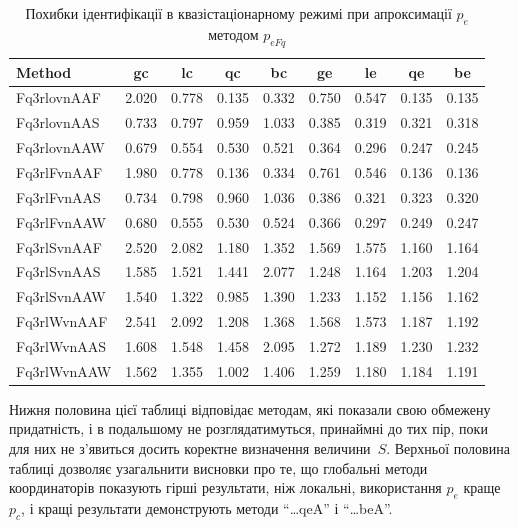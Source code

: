 \begin{table}[htb!]
  \caption{Похибки ідентифікації в квазістаціонарному режимі при апроксимації $p_e$ методом $p_{eFq}$}
  \label{atu:t:err_test_id_Fq}
  \begin{center}
    \begin{tabular}{|l|c|c|c|c|c|c|c|c|}
    \hline
    Method      & gc    & lc    & qc    & bc    & ge     & le    & qe    & be    \\ \hline
    Fq3rlovnAAF & 2.020 & 0.778 & 0.135 & 0.332 & 0.750  & 0.547 & 0.135 & 0.135 \\ \hline
    Fq3rlovnAAS & 0.733 & 0.797 & 0.959 & 1.033 & 0.385  & 0.319 & 0.321 & 0.318 \\ \hline
    Fq3rlovnAAW & 0.679 & 0.554 & 0.530 & 0.521 & 0.364  & 0.296 & 0.247 & 0.245 \\ \hline
    Fq3rlFvnAAF & 1.980 & 0.778 & 0.136 & 0.334 & 0.761  & 0.546 & 0.136 & 0.136 \\ \hline
    Fq3rlFvnAAS & 0.734 & 0.798 & 0.960 & 1.036 & 0.386  & 0.321 & 0.323 & 0.320 \\ \hline
    Fq3rlFvnAAW & 0.680 & 0.555 & 0.530 & 0.524 & 0.366  & 0.297 & 0.249 & 0.247 \\ \hline
    Fq3rlSvnAAF & 2.520 & 2.082 & 1.180 & 1.352 & 1.569  & 1.575 & 1.160 & 1.164 \\ \hline
    Fq3rlSvnAAS & 1.585 & 1.521 & 1.441 & 2.077 & 1.248  & 1.164 & 1.203 & 1.204 \\ \hline
    Fq3rlSvnAAW & 1.540 & 1.322 & 0.985 & 1.390 & 1.233  & 1.152 & 1.156 & 1.162 \\ \hline
    Fq3rlWvnAAF & 2.541 & 2.092 & 1.208 & 1.368 & 1.568  & 1.573 & 1.187 & 1.192 \\ \hline
    Fq3rlWvnAAS & 1.608 & 1.548 & 1.458 & 2.095 & 1.272  & 1.189 & 1.230 & 1.232 \\ \hline
    Fq3rlWvnAAW & 1.562 & 1.355 & 1.002 & 1.406 & 1.259  & 1.180 & 1.184 & 1.191 \\ \hline
    \end{tabular}
  \end{center}
\end{table}

Нижня половина цієї таблиці відповідає методам, які показали
свою обмежену придатність, і в подальшому не розглядатимуться,
принаймні до тих пір, поки для них не з'явиться досить коректне
визначення величини~$S$.
Верхньої половина таблиці дозволяє узагальнити висновки
про те, що глобальні методи координаторів показують гірші
результати, ніж локальні, використання
$ p_e $ краще
$ p_c $, і кращі результати демонструють методи ``\ldots qeA'' і ``\ldots beA''.

